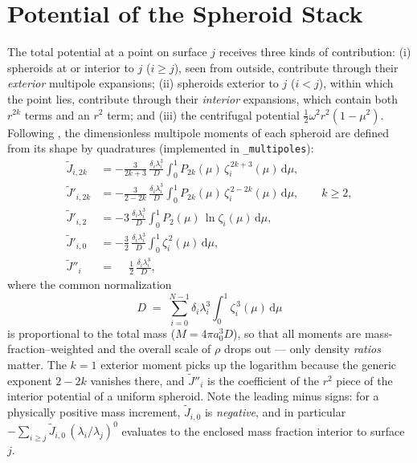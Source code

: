 \documentclass{aastex631}
\newcommand{\dd}{\mathrm{d}}
\newcommand{\Jt}{\tilde{J}}
\newcommand{\Jtp}{\tilde{J}'}
\newcommand{\Jtpp}{\tilde{J}''}
\begin{document}
\section{Potential of the Spheroid Stack}\label{sec:potential}

The total potential at a point on surface $j$ receives three kinds of
contribution: (i) spheroids at or interior to $j$ ($i \ge j$), seen from
outside, contribute through their \emph{exterior} multipole expansions;
(ii) spheroids exterior to $j$ ($i < j$), within which the point lies,
contribute through their \emph{interior} expansions, which contain both
$r^{2k}$ terms and an $r^2$ term; and (iii) the centrifugal potential
$\tfrac{1}{2}\omega^2 r^2 (1-\mu^2)$.  Following \citet[][Eqs.~40--43]
{Hubbard2013}, the dimensionless multipole moments of each spheroid are
defined from its shape by quadratures (implemented in
\texttt{\_multipoles}):
\begin{align}
\Jt_{i,2k} &= -\frac{3}{2k+3}\,
  \frac{\delta_i \lambda_i^3}{D} \int_0^1 P_{2k}(\mu)\,
  \zeta_i^{\,2k+3}(\mu)\,\dd\mu ,
\label{eq:Jint}\\[2pt]
\Jtp_{i,2k} &= -\frac{3}{2-2k}\,
  \frac{\delta_i \lambda_i^3}{D} \int_0^1 P_{2k}(\mu)\,
  \zeta_i^{\,2-2k}(\mu)\,\dd\mu , \qquad k \ge 2,
\label{eq:Jext}\\[2pt]
\Jtp_{i,2} &= -3\,\frac{\delta_i \lambda_i^3}{D}
  \int_0^1 P_{2}(\mu)\, \ln \zeta_i(\mu)\,\dd\mu ,
\label{eq:Jext2}\\[2pt]
\Jtp_{i,0} &= -\frac{3}{2}\,\frac{\delta_i \lambda_i^3}{D}
  \int_0^1 \zeta_i^{\,2}(\mu)\,\dd\mu ,
\label{eq:Jext0}\\[2pt]
\Jtpp_{i} &= \phantom{-}\frac{1}{2}\,\frac{\delta_i \lambda_i^3}{D},
\label{eq:Jpp}
\end{align}
where the common normalization
\begin{equation}
D \;=\; \sum_{i=0}^{N-1} \delta_i \lambda_i^3 \int_0^1
\zeta_i^{\,3}(\mu)\,\dd\mu
\label{eq:D}
\end{equation}
is proportional to the total mass ($M = 4\pi a_0^3 D$), so that all
moments are mass-fraction--weighted and the overall scale of $\rho$
drops out --- only density \emph{ratios} matter.  The $k=1$ exterior
moment picks up the logarithm because the generic exponent $2-2k$
vanishes there, and $\Jtpp_i$ is the coefficient of the $r^2$ piece of
the interior potential of a uniform spheroid.  Note the leading minus
signs: for a physically positive mass increment, $\Jt_{i,0}$ is
\emph{negative}, and in particular $-\sum_{i\ge j}\Jt_{i,0}\,
(\lambda_i/\lambda_j)^0$ evaluates to the enclosed mass fraction
interior to surface $j$.
\end{document}

